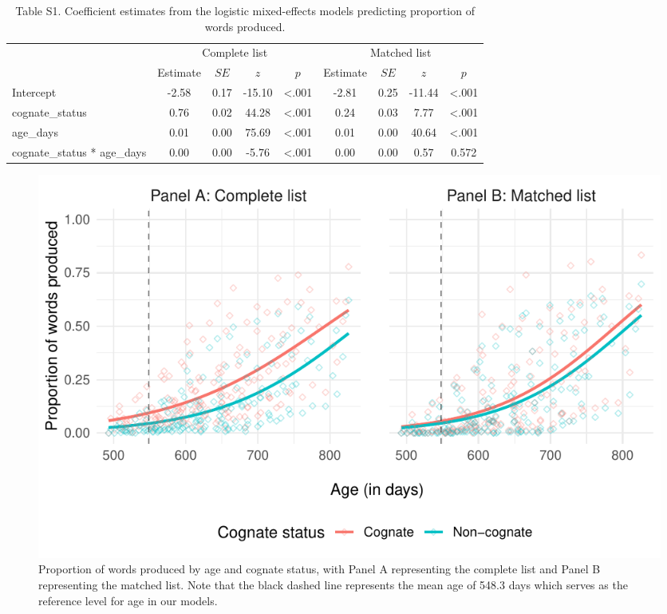 \documentclass[
  ,man,floatsintext]{apa6}
\begin{document}
\begin{table}[H]

\begin{center}
\begin{threeparttable}

\caption{\label{tab:Table S1}Table S1. Coefficient estimates from the logistic mixed-effects models predicting proportion of words produced.}

\begin{tabular}{lcccccccc}
\toprule
 & \multicolumn{4}{c}{Complete list} & \multicolumn{4}{c}{Matched list} \\
\cmidrule(r){2-5} \cmidrule(r){6-9}
 & Estimate & $SE$ & $z$ & $p$ & Estimate & $SE$ & $z$ & $p$\\
\midrule
Intercept & -2.58 & 0.17 & -15.10 & <.001 & -2.81 & 0.25 & -11.44 & <.001\\
cognate\_status & 0.76 & 0.02 & 44.28 & <.001 & 0.24 & 0.03 & 7.77 & <.001\\
age\_days & 0.01 & 0.00 & 75.69 & <.001 & 0.01 & 0.00 & 40.64 & <.001\\
cognate\_status * age\_days & 0.00 & 0.00 & -5.76 & <.001 & 0.00 & 0.00 & 0.57 & 0.572\\
\bottomrule
\end{tabular}

\end{threeparttable}
\end{center}

\end{table}

\begin{figure}

{\centering \includegraphics[width=1.2\linewidth]{CogVocab_supplemental_files/figure-latex/FigS1-1} 

}

\caption{Proportion of words produced by age and cognate status, with Panel A representing the complete list and Panel B representing the matched list. Note that the black dashed line represents the mean age of 548.3 days which serves as the reference level for age in our models.}\label{fig:FigS1}
\end{figure}
\end{document}
